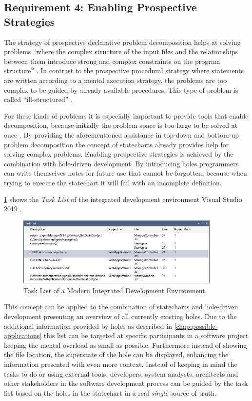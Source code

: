 \subsection{Requirement 4: Enabling Prospective Strategies}
The strategy of prospective declarative problem decomposition helps at solving problems ``where the complex structure of the input files and the relationships between them introduce strong and complex constraints on the program structure'' \autocite[243]{visser_expert_1990}.
In contrast to the prospective procedural strategy where statements are written according to a mental execution strategy, the problems are too complex to be guided by already available procedures.
This type of problem is called ``ill-structured'' \autocite[236]{visser_expert_1990}.

For these kinds of problems it is especially important to provide tools that enable decomposition, because initially the problem space is too large to be solved at once \autocite{dutke_mentale_1994}.
By providing the aforementioned assistance in top-down and bottom-up problem decomposition the concept of statecharts already provides help for solving complex problems.
Enabling prospective strategies is achieved by the combination with hole-driven development.
By introducing holes programmers can write themselves notes for future use that cannot be forgotten, because when trying to execute the statechart it will fail with an incomplete definition.

\cref{fig:vs-task-list} shows the \emph{Task List} of the integrated development environment Visual Studio 2019 \autocite{hogensen_use_2019}.
\begin{figure}[h]
\centering
\includegraphics[width=0.9\textwidth]{images/task-list}
\caption{Task List of a Modern Integrated Development Environment}
\label{fig:vs-task-list}
\end{figure}
This concept can be applied to the combination of statecharts and hole-driven development presenting an overview of all currently existing holes.
Due to the additional information provided by holes as described in \cref{chap:possible-applications} this list can be targeted at specific participants in a software project keeping the mental overload as small as possible.
Furthermore instead of showing the file location, the superstate of the hole can be displayed, enhancing the information presented with even more context.
Instead of keeping in mind the tasks to do or using external tools, developers, system analysts, architects and other stakeholders in the software development process can be guided by the task list based on the holes in the statechart in a real \emph{single} source of truth.

